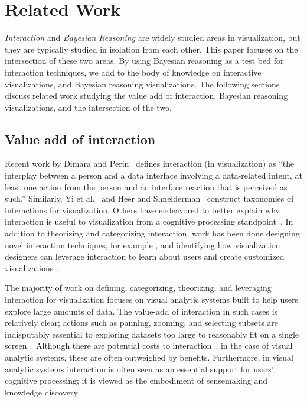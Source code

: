 \section{Related Work}

\textit{Interaction} and \textit{Bayesian Reasoning} are widely studied areas in visualization, but they are typically studied in isolation from each other. This paper focuses on the intersection of these two areas. By using Bayesian reasoning as a test bed for interaction techniques, we add to the body of knowledge on interactive visualizations, and Bayesian reasoning visualizations. The following sections discuss related work studying the value add of interaction, Bayesian reasoning visualizations, and the intersection of the two.

\subsection{Value add of interaction}
Recent work by Dimara and Perin~\cite{dimara2020What} defines interaction (in visualization) as ``the interplay between a person and a data interface involving a data-related intent, at least one action from the person and an interface reaction that is perceived as such.'' Similarly, Yi et al.~\cite{yi2007Toward} and Heer and Shneiderman~\cite{heer2012Interactive} construct taxonomies of interactions for visualization. Others have endeavored to better explain why interaction is useful to visualization from a cognitive processing standpoint~\cite{liu2010Mental, pohl2012User}. In addition to theorizing and categorizing interaction, work has been done designing novel interaction techniques, for example \cite{carpendale2012Beyond, goffin2020Interaction, lee2012Beyond, wybrow2014Interaction},
and identifying how visualization designers can leverage interaction to learn about users and create customized visualizations \cite{brown2012Disfunction, endert2012Semantic}. 

The majority of work on defining, categorizing, theorizing, and leveraging interaction for visualization focuses on visual analytic systems built to help users explore large amounts of data. The value-add of interaction in such cases is relatively clear; actions such as panning, zooming, and selecting subsets are indisputably essential to exploring datasets too large to reasonably fit on a single screen~\cite{wijk2005Value, heer2012Interactive}. Although there are potential costs to interaction~\cite{lam2008Framework, wijk2005Value}, in the case of visual analytic systems, these are often outweighed by benefits. Furthermore, in visual analytic systems interaction is often seen as an essential support for users' cognitive processing; it is viewed as the embodiment of sensemaking and knowledge discovery~\cite{yi2007Toward, pohl2012User, liu2010Mental, pike2009science}.  

